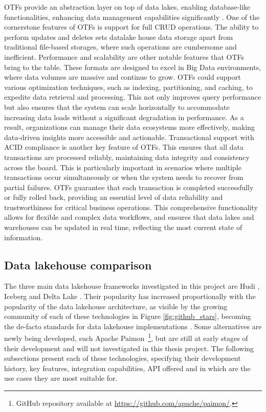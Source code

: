 \glspl{OTF} provide an abstraction layer on top of data lakes, enabling database-like functionalities, enhancing data management capabilities significantly \cite{lakehouse2021,DataLakehouseSurvey2025}. One of the cornerstone features of \glspl{OTF} is support for full \gls{CRUD} operations. The ability to perform updates and deletes sets datalake house data storage apart from traditional file-based storages, where such operations are cumbersome and inefficient. Performance and scalability are other notable features that \glspl{OTF} bring to the table. These formats are designed to excel in Big Data environments, where data volumes are massive and continue to grow. \glspl{OTF} could support various optimization techniques, such as indexing, partitioning, and caching, to expedite data retrieval and processing. This not only improves query performance but also ensures that the system can scale horizontally to accommodate increasing data loads without a significant degradation in performance. As a result, organizations can manage their data ecosystems more effectively, making data-driven insights more accessible and actionable. Transactional support with \gls{ACID} compliance is another key feature of \glspl{OTF}. This ensures that all data transactions are processed reliably, maintaining data integrity and consistency across the board. This is particularly important in scenarios where multiple transactions occur simultaneously or when the system needs to recover from partial failures. \glspl{OTF} guarantee that each transaction is completed successfully or fully rolled back, providing an essential level of data reliability and trustworthiness for critical business operations. This comprehensive functionality allows for flexible and complex data workflows, and ensures that data lakes and warehouses can be updated in real time, reflecting the most current state of information.



\subsection{Data lakehouse comparison}
\label{subsec:datalakehouse_comparison}

The three main data lakehouse frameworks investigated in this project are Hudi \cite{rajaperumalUberEngineeringIncremental2017}, Iceberg \cite{IcebergExamples2024} and Delta Lake \cite{armbrustDeltaLakeHighperformance2020}. Their popularity has increased proportionally with the popularity of the data lakehouse architecture, as visible by the growing community of each of these technologies in Figure \ref{fig:github_stars}, becoming the de-facto standards for data lakehouse implementations \cite{jainAnalyzingComparingLakehouse2023}. Some alternatives are newly being developed, such Apache Paimon~\footnote{GitHub repository available at \url{https://github.com/apache/paimon/}.}, but are still at early stages of their development and will not investigated in this thesis project. The following subsections present each of these technologies, specifying their development history, key features, integration capabilities, \gls{API} offered and in which are the use cases they are most suitable for. 

